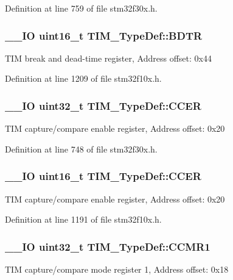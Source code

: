 Definition at line 759 of file stm32f30x.\-h.

\hypertarget{struct_t_i_m___type_def_a32bbedb8b418359c6873375ec949cf8b}{
\subsubsection[{B\-D\-T\-R}]{\setlength{\rightskip}{0pt plus 5cm}\-\_\-\-\_\-\-I\-O {\bf uint16\-\_\-t} T\-I\-M\-\_\-\-Type\-Def\-::\-B\-D\-T\-R}}\label{struct_t_i_m___type_def_a32bbedb8b418359c6873375ec949cf8b}
T\-I\-M break and dead-\/time register, Address offset\-: 0x44 

Definition at line 1209 of file stm32f10x.\-h.

\hypertarget{struct_t_i_m___type_def_ad7271cc1eec9ef16e4ee5401626c0b3b}{
\subsubsection[{C\-C\-E\-R}]{\setlength{\rightskip}{0pt plus 5cm}\-\_\-\-\_\-\-I\-O {\bf uint32\-\_\-t} T\-I\-M\-\_\-\-Type\-Def\-::\-C\-C\-E\-R}}\label{struct_t_i_m___type_def_ad7271cc1eec9ef16e4ee5401626c0b3b}
T\-I\-M capture/compare enable register, Address offset\-: 0x20 

Definition at line 748 of file stm32f30x.\-h.

\hypertarget{struct_t_i_m___type_def_a2a7ebf9d3041dc20da591668d916f5bc}{
\subsubsection[{C\-C\-E\-R}]{\setlength{\rightskip}{0pt plus 5cm}\-\_\-\-\_\-\-I\-O {\bf uint16\-\_\-t} T\-I\-M\-\_\-\-Type\-Def\-::\-C\-C\-E\-R}}\label{struct_t_i_m___type_def_a2a7ebf9d3041dc20da591668d916f5bc}
T\-I\-M capture/compare enable register, Address offset\-: 0x20 

Definition at line 1191 of file stm32f10x.\-h.

\hypertarget{struct_t_i_m___type_def_a0f2291e7efdf3222689ef13e9be2ea4a}{
\subsubsection[{C\-C\-M\-R1}]{\setlength{\rightskip}{0pt plus 5cm}\-\_\-\-\_\-\-I\-O {\bf uint32\-\_\-t} T\-I\-M\-\_\-\-Type\-Def\-::\-C\-C\-M\-R1}}\label{struct_t_i_m___type_def_a0f2291e7efdf3222689ef13e9be2ea4a}
T\-I\-M capture/compare mode register 1, Address offset\-: 0x18 


